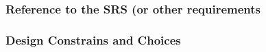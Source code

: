 \documentclass{template/openetcs_report}
\begin{document}
\subsubsection{Reference to the SRS (or other requirements}
\subsubsection{Design Constrains and Choices}



\appendix


%
%
%
%


\newpage
{}
\printindex

\end{document}
